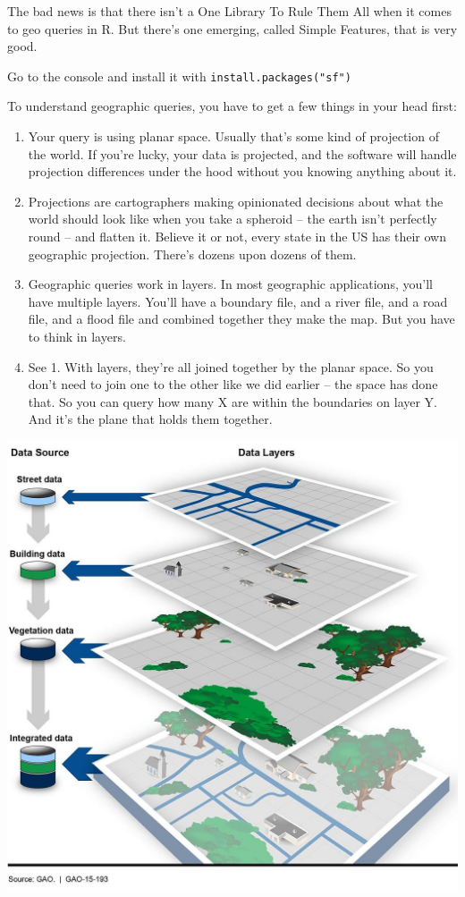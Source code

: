 \documentclass[
  letterpaper,
  DIV=11,
  numbers=noendperiod]{scrreprt}
\providecommand{\tightlist}{%
  \setlength{\itemsep}{0pt}\setlength{\parskip}{0pt}}\usepackage{longtable,booktabs,array}
\begin{document}
The bad news is that there isn't a One Library To Rule Them All when it
comes to geo queries in R. But there's one emerging, called Simple
Features, that is very good.

Go to the console and install it with \texttt{install.packages("sf")}

To understand geographic queries, you have to get a few things in your
head first:

\begin{enumerate}
\def\labelenumi{\arabic{enumi}.}
\tightlist
\item
  Your query is using planar space. Usually that's some kind of
  projection of the world. If you're lucky, your data is projected, and
  the software will handle projection differences under the hood without
  you knowing anything about it.
\item
  Projections are cartographers making opinionated decisions about what
  the world should look like when you take a spheroid -- the earth isn't
  perfectly round -- and flatten it. Believe it or not, every state in
  the US has their own geographic projection. There's dozens upon dozens
  of them.
\item
  Geographic queries work in layers. In most geographic applications,
  you'll have multiple layers. You'll have a boundary file, and a river
  file, and a road file, and a flood file and combined together they
  make the map. But you have to think in layers.
\item
  See 1. With layers, they're all joined together by the planar space.
  So you don't need to join one to the other like we did earlier -- the
  space has done that. So you can query how many X are within the
  boundaries on layer Y. And it's the plane that holds them together.
\end{enumerate}

\includegraphics{./images/geolayers.jpg}
\end{document}

